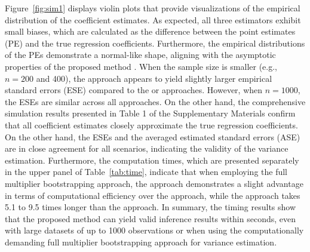 Figure~\ref{fig:sim1} displays violin plots that provide visualizations of the empirical 
distribution of the coefficient estimates. 
As expected, all three estimators exhibit small biases, 
which are calculated as the difference between the point estimates (PE) and the true regression coefficients. 
Furthermore, the empirical distributions of the PEs demonstrate a normal-like shape, 
aligning with the asymptotic properties of the proposed method \citep{li2016quantile, kim2023smoothed}.
When the sample size is smaller (e.g., $n = 200$ and 400), 
the  approach appears to yield slightly larger empirical standard errors (ESE) 
compared to the  or  approaches. 
However, when $n = 1000$, the ESEs are similar across all approaches. 
On the other hand, the comprehensive simulation results presented in Table 1 of the Supplementary Materials 
confirm that all coefficient estimates closely approximate the true regression coefficients.
On the other hand, the ESEs and the averaged estimated standard errors (ASE) are in close agreement for all scenarios, 
indicating the validity of the variance estimation.
Furthermore, the computation times, which are presented separately in the upper panel of Table~\ref{tab:time}, 
indicate that when employing the full multiplier bootstrapping approach, 
the  approach demonstrates a slight advantage in terms of computational efficiency over the 
 approach, while the  approach takes 5.1 to 9.5 times longer than the  approach.
In summary, the timing results show that the proposed method can yield valid inference results within seconds,
even with large datasets of up to 1000 observations or 
when using the computationally demanding full multiplier bootstrapping approach for variance estimation.


